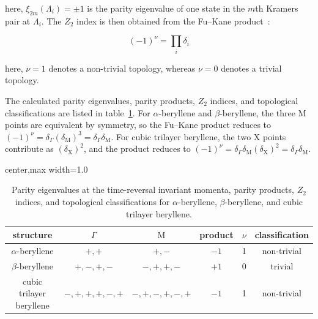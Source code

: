 here,
$\xi_{2m}(\Lambda_i)=\pm 1$ is the parity eigenvalue of one state in the $m$th Kramers pair at $\Lambda_i$.
The $Z_{2}$ index is then obtained from the Fu--Kane product~\cite{fu2007topological,fu2007topological3d}:

\begin{equation}
    (-1)^{\nu} =
    \prod_i \delta_i
\label{eq:proj3_z2_index}
\end{equation}

here,
$\nu=1$ denotes a non-trivial topology,
whereas $\nu=0$ denotes a trivial topology.

The calculated parity eigenvalues,
parity products,
$Z_{2}$ indices,
and topological classifications are listed in table~\ref{tab:proj3_topological_parity}.
For $\alpha$-beryllene and $\beta$-beryllene,
the three $\mathrm{M}$ points are equivalent by symmetry,
so the Fu--Kane product reduces to
$(-1)^{\nu}=\delta_{\Gamma}(\delta_{\mathrm{M}})^3=\delta_{\Gamma}\delta_{\mathrm{M}}$.
For cubic trilayer beryllene,
the two $\mathrm{X}$ points contribute as $(\delta_{\mathrm{X}})^2$,
and the product reduces to
$(-1)^{\nu}=\delta_{\Gamma}\delta_{\mathrm{M}}(\delta_{\mathrm{X}})^2=\delta_{\Gamma}\delta_{\mathrm{M}}$.

\begin{table}[!htbp]
\centering
{}
\begin{adjustbox}{center,max width=1.0\linewidth}
\begin{tabular}{cccccc}
\hline
\rowcolor{gray!25}
structure
& $\Gamma$
& $\mathrm{M}$
& product
& $\nu$
& classification \\ \hline

$\alpha$-beryllene
& $+, +$
& $+, -$
& $-1$
& 1
& non-trivial \\

$\beta$-beryllene
& $+, -, +, -$
& $-, +, +, -$
& $+1$
& 0
& trivial \\

cubic trilayer beryllene
& $-, +, +, +, -, +$
& $-, +, -, +, -, +$
& $-1$
& 1
& non-trivial \\

\hline
\end{tabular}
\end{adjustbox}
\caption{Parity eigenvalues at the time-reversal invariant momenta,
parity products,
$Z_{2}$ indices,
and topological classifications for $\alpha$-beryllene,
$\beta$-beryllene,
and cubic trilayer beryllene.}
\label{tab:proj3_topological_parity}
\end{table}


